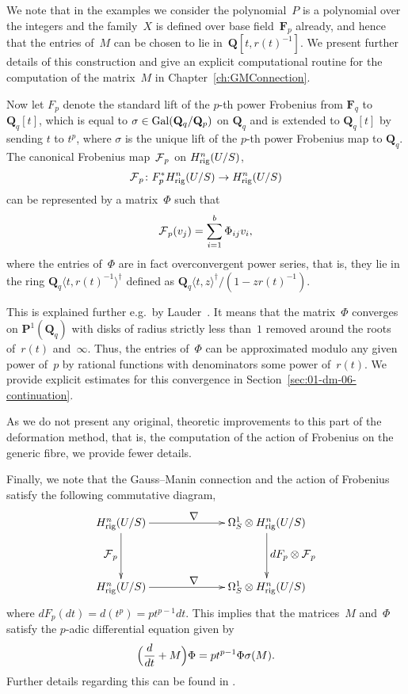 We note that in the examples we consider the polynomial~$P$ is a polynomial 
over the integers and the family~$X$ is defined over base field~$\mathbf{F}_p$ 
already, and hence that the entries of~$M$ can be chosen to lie 
in~$\mathbf{Q}[t,r(t)^{-1}]$.  We present further details of this construction 
and give an explicit computational routine for the computation of the 
matrix~$M$ in Chapter~\ref{ch:GMConnection}.

Now let $F_p$ denote the standard lift of the $p$-th power Frobenius 
from $\mathbf{F}_q$ to $\mathbf{Q}_q[t]$, which is equal to 
$\sigma \in \operatorname{Gal}(\mathbf{Q}_q/\mathbf{Q}_p)$ on $\mathbf{Q}_q$ and 
is extended to $\mathbf{Q}_q[t]$ by sending $t$ to $t^p$, where $\sigma$ 
is the unique lift of the $p$-th power Frobenius map to $\mathbf{Q}_q$.  
The canonical Frobenius map~$\operatorname{\mathcal{F}}_p$ on $H_{\text{rig}}^{n}(U/S)$,
\begin{equation*}
\operatorname{\mathcal{F}}_p \colon F_p^{*} H_{\text{rig}}^{n}(U/S) \rightarrow H_{\text{rig}}^{n}(U/S)
\end{equation*}
can be represented by a matrix~$\Phi$ such that 
\begin{equation*}
\operatorname{\mathcal{F}}_p (v_j) = \sum_{i=1}^{b} \Phi_{ij} v_i,
\end{equation*}
where the entries of~$\Phi$ are in fact overconvergent power series, 
that is, they lie in the ring $\mathbf{Q}_q\langle t, r(t)^{-1}\rangle^{\dagger}$ 
defined as $\mathbf{Q}_q \langle t, z \rangle^{\dagger} / (1 - z r(t)^{-1})$.

This is explained further e.g.\ by Lauder~\citep[\S 3.5]{Lauder2006}.  
It means that the matrix~$\Phi$ converges on $\mathbf{P}^{1}(\mathbf{Q}_q)$ 
with disks of radius strictly less than~$1$ removed around the roots of~$r(t)$ 
and~$\infty$.  Thus, the entries of~$\Phi$ can be approximated modulo 
any given power of~$p$ by rational functions with denominators some 
power of~$r(t)$.  We provide explicit estimates for this convergence 
in Section~\ref{sec:01-dm-06-continuation}.

As we do not present any original, theoretic improvements to this part of 
the deformation method, that is, the computation of the action of Frobenius 
on the generic fibre, we provide fewer details.

Finally, we note that the Gauss--Manin connection and the action of 
Frobenius satisfy the following commutative diagram,
\begin{equation*}
\def\labelstyle{\textstyle}
\xymatrix@C=6.8em@R=4em{
\Hrig^{n}(U/S) \ar[d]_{\Frob_p} \ar[r]^{\nabla} & 
\Omega_{S}^{1} \otimes \Hrig^{n}(U/S) \ar[d]^{d F_p \otimes \Frob_p} \\
\Hrig^{n}(U/S) \ar[r]^{\nabla} & 
\Omega_{S}^{1} \otimes \Hrig^{n}(U/S) 
}
\end{equation*}
where $d F_p (dt) = d(t^p) = p t^{p-1} dt$.  This implies that the 
matrices~$M$ and~$\Phi$ satisfy the $p$-adic differential equation given by 
\begin{equation*}
\Bigl( \frac{d}{dt} + M \Bigr) \Phi = p t^{p-1} \Phi \sigma(M).
\end{equation*}
Further details regarding this can be found in \citep[\S 5]{Gerkmann2007}.

